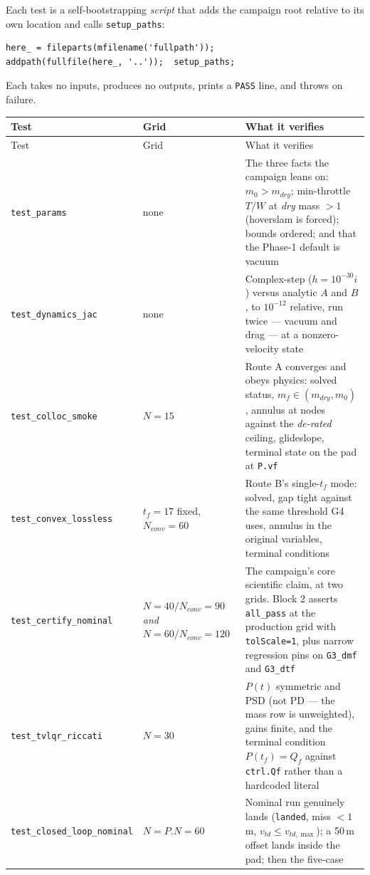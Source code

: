 \documentclass[11pt]{article}
\begin{document}
Each test is a self-bootstrapping \emph{script} that adds the campaign root
relative to its own location and calls \texttt{setup\_paths}:
\begin{verbatim}
here_ = fileparts(mfilename('fullpath'));
addpath(fullfile(here_, '..'));  setup_paths;
\end{verbatim}
Each takes no inputs, produces no outputs, prints a \texttt{PASS} line, and
throws on failure.

\begin{center}
\begin{longtable}{@{}lL{3.2cm}L{5.9cm}@{}}
\toprule
Test & Grid & What it verifies \\
\midrule
\endfirsthead
\toprule
Test & Grid & What it verifies \\
\midrule
\endhead
\texttt{test\_params} & none &
The three facts the campaign leans on: $m_0>m_{dry}$; min-throttle $T/W$ at
\emph{dry} mass $>1$ (hoverslam is forced); bounds ordered; and that the
Phase-1 default is vacuum \\
\texttt{test\_dynamics\_jac} & none &
Complex-step ($h = 10^{-30}i$) versus analytic $A$ and $B$, to $10^{-12}$
relative, run twice --- vacuum and drag --- at a nonzero-velocity state \\
\texttt{test\_colloc\_smoke} & $N=15$ &
Route A converges and obeys physics: solved status, $m_f\in(m_{dry},m_0)$,
annulus at nodes against the \emph{de-rated} ceiling, glideslope, terminal
state on the pad at \texttt{P.vf} \\
\texttt{test\_convex\_lossless} & $t_f=17$ fixed, $N_{conv}=60$ &
Route B's single-$t_f$ mode: solved, gap tight against the same threshold
G4 uses, annulus in the original variables, terminal conditions \\
\texttt{test\_certify\_nominal} & $N{=}40/N_{conv}{=}90$
\emph{and} $N{=}60/N_{conv}{=}120$ &
The campaign's core scientific claim, at two grids. Block 2 asserts
\texttt{all\_pass} at the production grid with \texttt{tolScale=1}, plus
narrow regression pins on \texttt{G3\_dmf} and \texttt{G3\_dtf} \\
\texttt{test\_tvlqr\_riccati} & $N=30$ &
$P(t)$ symmetric and PSD (not PD --- the mass row is unweighted), gains
finite, and the terminal condition $P(t_f)=Q_f$ against \texttt{ctrl.Qf}
rather than a hardcoded literal \\
\texttt{test\_closed\_loop\_nominal} & $N=P.N=60$ &
Nominal run genuinely lands (\texttt{landed}, miss $<1$\,m, $v_{td}\le
v_{td,\max}$); a 50\,m offset lands inside the pad; then the five-case

\end{longtable}
\end{center}
\end{document}
